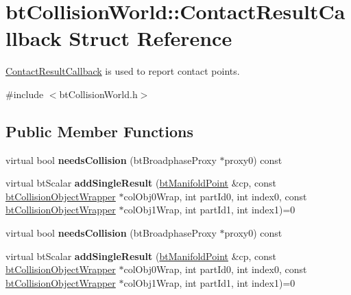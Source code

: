 \hypertarget{structbtCollisionWorld_1_1ContactResultCallback}{}\section{bt\+Collision\+World\+:\+:Contact\+Result\+Callback Struct Reference}
\label{structbtCollisionWorld_1_1ContactResultCallback}


\hyperlink{structbtCollisionWorld_1_1ContactResultCallback}{Contact\+Result\+Callback} is used to report contact points.  




{\ttfamily \#include $<$bt\+Collision\+World.\+h$>$}

\subsection*{Public Member Functions}
\begin{DoxyCompactItemize}
\item 
\mbox{\label{structbtCollisionWorld_1_1ContactResultCallback_ab0cd784e87b23b5857d71019550a3e88}} 
virtual bool {\bfseries needs\+Collision} (bt\+Broadphase\+Proxy $\ast$proxy0) const
\item 
\mbox{\label{structbtCollisionWorld_1_1ContactResultCallback_a9ee122de8c9b5920a53a2cc69c3c4aa2}} 
virtual bt\+Scalar {\bfseries add\+Single\+Result} (\hyperlink{classbtManifoldPoint}{bt\+Manifold\+Point} \&cp, const \hyperlink{structbtCollisionObjectWrapper}{bt\+Collision\+Object\+Wrapper} $\ast$col\+Obj0\+Wrap, int part\+Id0, int index0, const \hyperlink{structbtCollisionObjectWrapper}{bt\+Collision\+Object\+Wrapper} $\ast$col\+Obj1\+Wrap, int part\+Id1, int index1)=0
\item 
\mbox{\label{structbtCollisionWorld_1_1ContactResultCallback_ab0cd784e87b23b5857d71019550a3e88}} 
virtual bool {\bfseries needs\+Collision} (bt\+Broadphase\+Proxy $\ast$proxy0) const
\item 
\mbox{\label{structbtCollisionWorld_1_1ContactResultCallback_a9ee122de8c9b5920a53a2cc69c3c4aa2}} 
virtual bt\+Scalar {\bfseries add\+Single\+Result} (\hyperlink{classbtManifoldPoint}{bt\+Manifold\+Point} \&cp, const \hyperlink{structbtCollisionObjectWrapper}{bt\+Collision\+Object\+Wrapper} $\ast$col\+Obj0\+Wrap, int part\+Id0, int index0, const \hyperlink{structbtCollisionObjectWrapper}{bt\+Collision\+Object\+Wrapper} $\ast$col\+Obj1\+Wrap, int part\+Id1, int index1)=0
\end{DoxyCompactItemize}
